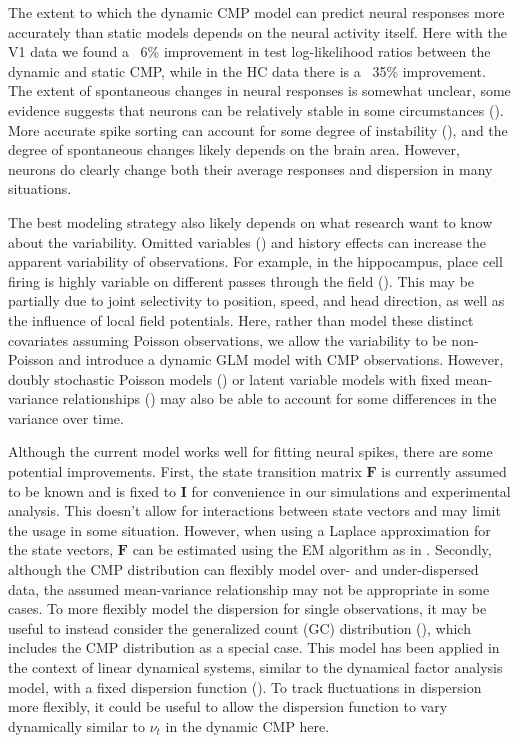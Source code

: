 \documentclass[aoas]{imsart}
\theoremstyle{plain}
\theoremstyle{remark}
\begin{document}
The extent to which the dynamic CMP model can predict neural responses more accurately than static models depends on the neural activity itself. Here with the V1 data we found a ~6\% improvement in test log-likelihood ratios between the dynamic and static CMP, while in the HC data there is a ~35\% improvement. The extent of spontaneous changes in neural responses is somewhat unclear, some evidence suggests that neurons can be relatively stable in some circumstances (\cite{Chestek2007,Stevenson2011a,Dickey2009}). More accurate spike sorting can account for some degree of instability (\cite{Steinmetz2021}), and the degree of spontaneous changes likely depends on the brain area. However, neurons do clearly change both their average responses and dispersion in many situations.

The best modeling strategy also likely depends on what research want to know about the variability. Omitted variables (\cite{Stevenson2018}) and history effects can increase the apparent variability of observations. For example, in the hippocampus, place cell firing is highly variable on different passes through the field (\cite{Fenton1998}). This may be partially due to joint selectivity to position, speed, and head direction, as well as the influence of local field potentials. Here, rather than model these distinct covariates assuming Poisson observations, we allow the variability to be non-Poisson and introduce a dynamic GLM model with CMP observations. However, doubly stochastic Poisson models (\cite{Barbieri2001}) or latent variable models with fixed mean-variance relationships (\cite{Gao2015,Pillow2012}) may also be able to account for some differences in the variance over time.

Although the current model works well for fitting neural spikes, there are some potential improvements. First, the state transition matrix $\bm{F}$ is currently assumed to be known and is fixed to $\bm{I}$ for convenience in our simulations and experimental analysis. This doesn’t allow for interactions between state vectors and may limit the usage in some situation. However, when using a Laplace approximation for the state vectors, $\bm{F}$ can be estimated using the EM algorithm as in \cite{Macke2011}. Secondly, although the CMP distribution can flexibly model over- and under-dispersed data, the assumed mean-variance relationship may not be appropriate in some cases. To more flexibly model the dispersion for single observations, it may be useful to instead consider the generalized count (GC) distribution (\cite{DelCastillo2005}), which includes the CMP distribution as a special case. This model has been applied in the context of linear dynamical systems, similar to the dynamical factor analysis model,  with a fixed dispersion function (\cite{Gao2015}). To track fluctuations in dispersion more flexibly, it could be useful to allow the dispersion function to vary dynamically similar to $\nu_t$ in the dynamic CMP here.
\end{document}
